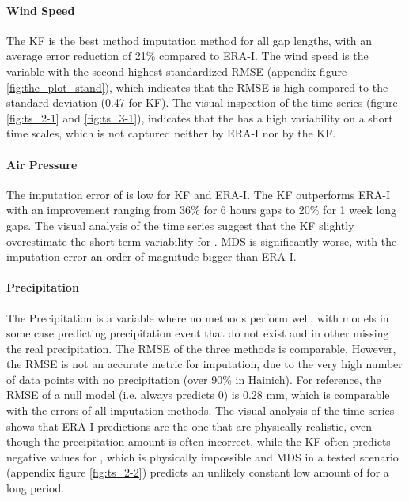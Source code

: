 \documentclass{article}
\begin{document}
\paragraph{Wind Speed} The KF is the best method imputation method for all gap lengths, with an average error reduction of 21\% compared to ERA-I. The wind speed is the variable with the second highest standardized RMSE (appendix figure \ref{fig:the_plot_stand}), which indicates that the RMSE is high compared to the  standard deviation (0.47 for KF). The visual inspection of the time series (figure \ref{fig:ts_2-1} and \ref{fig:ts_3-1}), indicates that the  has a high variability on a short time scales, which is not captured neither by ERA-I nor by the KF.

\paragraph{Air Pressure} The imputation error of  is low for KF and ERA-I. The KF outperforms ERA-I with an improvement ranging from 36\% for 6 hours gaps to 20\% for 1 week long gaps. The visual analysis of the time series suggest that the KF slightly overestimate the short term variability for . MDS is significantly worse, with the imputation error an order of magnitude bigger than ERA-I.

\paragraph{Precipitation} The Precipitation is a variable where no methods perform well, with models in some case predicting precipitation event that do not exist and in other missing the real precipitation. The RMSE of the three methods is comparable. However, the RMSE is not an accurate metric for  imputation, due to the very high number of data points with no precipitation (over 90\% in Hainich). For reference, the RMSE of a null model (i.e. always predicts 0) is 0.28 \si{mm}, which is comparable with the errors of all imputation methods. 
The visual analysis of the time series shows that ERA-I predictions are the one that are physically realistic, even though the precipitation amount is often incorrect, while the KF often predicts negative values for , which is physically impossible and MDS in a tested scenario (appendix figure \ref{fig:ts_2-2}) predicts an unlikely constant low amount of  for a long period.
\end{document}
